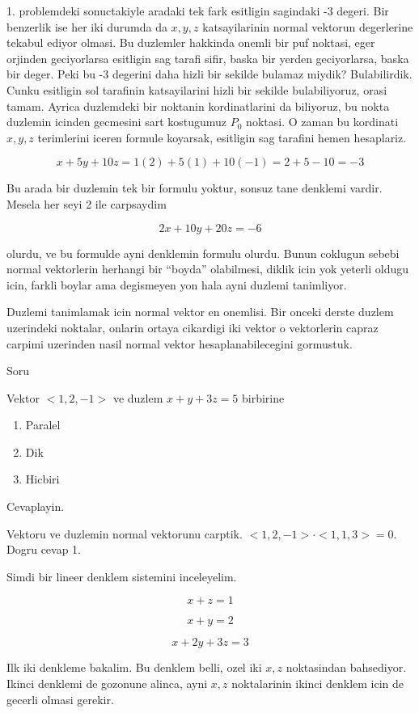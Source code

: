 \documentclass[12pt,fleqn]{article}
\begin{document}
1. problemdeki sonuctakiyle aradaki tek fark esitligin sagindaki -3
degeri. Bir benzerlik ise her iki durumda da $x,y,z$ katsayilarinin normal
vektorun degerlerine tekabul ediyor olmasi. Bu duzlemler hakkinda onemli
bir puf noktasi, eger orjinden geciyorlarsa esitligin sag tarafi sifir,
baska bir yerden geciyorlarsa, baska bir deger. Peki bu -3 degerini daha
hizli bir sekilde bulamaz miydik? Bulabilirdik. Cunku esitligin sol
tarafinin katsayilarini hizli bir sekilde bulabiliyoruz, orasi
tamam. Ayrica duzlemdeki bir noktanin kordinatlarini da biliyoruz, bu nokta
duzlemin icinden gecmesini sart kostugumuz $P_0$ noktasi. O zaman bu
kordinati $x,y,z$ terimlerini iceren formule koyarsak, esitligin sag
tarafini hemen hesaplariz. 

\[ x+5y + 10z = 1(2) + 5(1) + 10(-1) = 2 + 5 -10 = -3\]

Bu arada bir duzlemin tek bir formulu yoktur, sonsuz tane denklemi
vardir. Mesela her seyi 2 ile carpsaydim

\[ 2x+10y+20z = -6 \]

olurdu, ve bu formulde ayni denklemin formulu olurdu. Bunun coklugun sebebi
normal vektorlerin herhangi bir ``boyda'' olabilmesi, diklik icin yok
yeterli oldugu icin, farkli boylar ama degismeyen yon hala ayni duzlemi
tanimliyor. 

Duzlemi tanimlamak icin normal vektor en onemlisi. Bir onceki derste duzlem
uzerindeki noktalar, onlarin ortaya cikardigi iki vektor o vektorlerin capraz
carpimi uzerinden nasil normal vektor hesaplanabilecegini gormustuk.

Soru

Vektor $<1,2,-1>$ ve duzlem $x+y+3z = 5$ birbirine

\begin{enumerate}
   \item Paralel
   \item Dik
   \item Hicbiri
\end{enumerate}

Cevaplayin. 

Vektoru ve duzlemin normal vektorunu carptik. $<1,2,-1>\cdot<1,1,3> =
0$. 
Dogru cevap 1.

Simdi bir lineer denklem sistemini inceleyelim.

\[ x + z = 1  \]

\[ x + y = 2 \]

\[ x + 2y + 3z = 3 \]

Ilk iki denkleme bakalim. Bu denklem belli, ozel iki $x,z$ noktasindan
bahsediyor. Ikinci denklemi de gozonune alinca, ayni $x,z$ noktalarinin 
ikinci denklem icin de gecerli olmasi gerekir.
\end{document}
